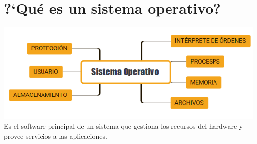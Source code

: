 \documentclass[12pt,a4paper]{report}
\begin{document}
\section{?`Qu\'{e} es un sistema operativo?}
\includegraphics[width=1\textwidth]{../images/sistema_operativo.png}
Es el software principal de un sistema que gestiona los recursos del hardware y provee servicios a las aplicaciones.
\par\vspace{1cm}
\end{document}

